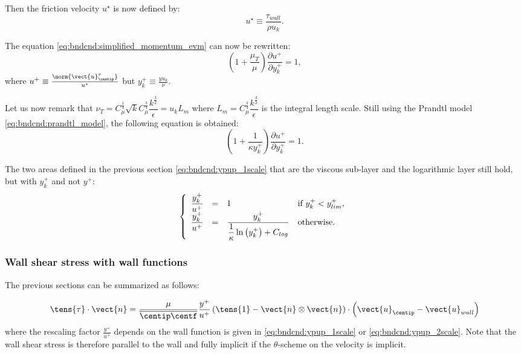 Then the friction velocity $u^\star $ is now defined by:
\begin{equation}\label{eq:bndcnd:ustar_2scale2_def}
u^\star \equiv  \dfrac{\tau_{wall}}{\rho u_k}.
\end{equation}

The equation \eqref{eq:bndcnd:simplified_momentum_evm} can now be rewritten:
%
\begin{equation}\label{eq:bndcnd:simplified_momentum_evm_2scales}
\left( 1 + \dfrac{\mu_T}{ \mu} \right) \dfrac{\partial u^+}{\partial y^+_k} = 1,
\end{equation}
where $u^+ \equiv \frac{\norm{ \vect{u}^r_{\centip} }}{u^\star}$ but $ y^+_k \equiv \frac{y u_k}{ \nu}$.

Let us now remark that $\nu_T = C_\mu^{\frac{1}{4}}\sqrt{k}  C_\mu^{\frac{3}{4}} \dfrac{k^{\frac{3}{2}}}{\epsilon} = u_k L_m $ where 
$L_m = C_\mu^{\frac{3}{4}} \dfrac{k^{\frac{3}{2}}}{\epsilon}$ is the integral length scale. Still using the Prandtl model \eqref{eq:bndcnd:prandtl_model},
the following equation is obtained:
%
\begin{equation}\label{eq:bndcnd:simplified_momentum_evm}
\left( 1 + \dfrac{1}{\kappa y_k^+} \right) \dfrac{\partial u^+}{\partial y^+_k} = 1.
\end{equation}
 
The two areas defined in the previous section \eqref{eq:bndcnd:ypup_1scale} that are the viscous sub-layer and the logarithmic layer still hold, but with $y^+_k$ and not $y^+$:
%
\begin{equation}\label{eq:bndcnd:ypup_2scale}
\left\lbrace
\begin{array}{r c l l}
\dfrac{y^+_k}{u^+} &=& 1 & \textrm{if } y^+_k < y^+_{lim}, \\
\dfrac{y^+_k}{u^+} &=& \dfrac{y^+_k}{ \dfrac{1}{\kappa} \ln \left( y^+_k\right) + C_{log}} & \textrm{otherwise}.
\end{array}
\right.
\end{equation}  

\subsubsection{Wall shear stress with wall functions}
The previous sections can be summarized as follows: 

\begin{equation}
\tens{\tau} \cdot \vect{n} = \dfrac{\mu}{\overline{\centip \centf} } \dfrac{y^+}{u^+} \left(\tens{1} - \vect{n} \otimes \vect{n} \right) \cdot \left(\vect{u}_\centip - \vect{u}_{wall} \right)
\end{equation}
%
where the rescaling factor $\frac{y^+}{u^+}$ depends on the wall function is given in \eqref{eq:bndcnd:ypup_1scale} or \eqref{eq:bndcnd:ypup_2scale}. Note that the wall shear stress is therefore parallel to the wall and fully implicit if the $\theta$-scheme on the velocity is implicit. 

